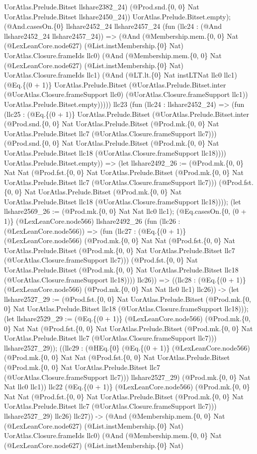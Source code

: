 \documentclass[11pt]{article}
\begin{document}
UorAtlas.Prelude.Bitset llshare2382\_24) (@Prod.snd.\{0, 0\} Nat UorAtlas.Prelude.Bitset llshare2450\_24)) UorAtlas.Prelude.Bitset.empty); (@And.casesOn.\{0\} llshare2452\_24 llshare2457\_24 (fun (llc24 : (@And llshare2452\_24 llshare2457\_24)) => (@And (@Membership.mem.\{0, 0\} Nat (@LexLeanCore.node627) (@List.instMembership.\{0\} Nat) UorAtlas.Closure.frameIds llc0) (@And (@Membership.mem.\{0, 0\} Nat (@LexLeanCore.node627) (@List.instMembership.\{0\} Nat) UorAtlas.Closure.frameIds llc1) (@And (@LT.lt.\{0\} Nat instLTNat llc0 llc1) (@Eq.\{(0 + 1)\} UorAtlas.Prelude.Bitset (@UorAtlas.Prelude.Bitset.inter (@UorAtlas.Closure.frameSupport llc0) (@UorAtlas.Closure.frameSupport llc1)) UorAtlas.Prelude.Bitset.empty))))) llc23 (fun (llc24 : llshare2452\_24) => (fun (llc25 : (@Eq.\{(0 + 1)\} UorAtlas.Prelude.Bitset (@UorAtlas.Prelude.Bitset.inter (@Prod.snd.\{0, 0\} Nat UorAtlas.Prelude.Bitset (@Prod.mk.\{0, 0\} Nat UorAtlas.Prelude.Bitset llc7 (@UorAtlas.Closure.frameSupport llc7))) (@Prod.snd.\{0, 0\} Nat UorAtlas.Prelude.Bitset (@Prod.mk.\{0, 0\} Nat UorAtlas.Prelude.Bitset llc18 (@UorAtlas.Closure.frameSupport llc18)))) UorAtlas.Prelude.Bitset.empty)) => (let llshare2492\_26 := (@Prod.mk.\{0, 0\} Nat Nat (@Prod.fst.\{0, 0\} Nat UorAtlas.Prelude.Bitset (@Prod.mk.\{0, 0\} Nat UorAtlas.Prelude.Bitset llc7 (@UorAtlas.Closure.frameSupport llc7))) (@Prod.fst.\{0, 0\} Nat UorAtlas.Prelude.Bitset (@Prod.mk.\{0, 0\} Nat UorAtlas.Prelude.Bitset llc18 (@UorAtlas.Closure.frameSupport llc18)))); (let llshare2569\_26 := (@Prod.mk.\{0, 0\} Nat Nat llc0 llc1); (@Eq.casesOn.\{0, (0 + 1)\} (@LexLeanCore.node566) llshare2492\_26 (fun (llc26 : (@LexLeanCore.node566)) => (fun (llc27 : (@Eq.\{(0 + 1)\} (@LexLeanCore.node566) (@Prod.mk.\{0, 0\} Nat Nat (@Prod.fst.\{0, 0\} Nat UorAtlas.Prelude.Bitset (@Prod.mk.\{0, 0\} Nat UorAtlas.Prelude.Bitset llc7 (@UorAtlas.Closure.frameSupport llc7))) (@Prod.fst.\{0, 0\} Nat UorAtlas.Prelude.Bitset (@Prod.mk.\{0, 0\} Nat UorAtlas.Prelude.Bitset llc18 (@UorAtlas.Closure.frameSupport llc18)))) llc26)) => ((llc28 : (@Eq.\{(0 + 1)\} (@LexLeanCore.node566) (@Prod.mk.\{0, 0\} Nat Nat llc0 llc1) llc26)) -> (let llshare2527\_29 := (@Prod.fst.\{0, 0\} Nat UorAtlas.Prelude.Bitset (@Prod.mk.\{0, 0\} Nat UorAtlas.Prelude.Bitset llc18 (@UorAtlas.Closure.frameSupport llc18))); (let llshare2529\_29 := (@Eq.\{(0 + 1)\} (@LexLeanCore.node566) (@Prod.mk.\{0, 0\} Nat Nat (@Prod.fst.\{0, 0\} Nat UorAtlas.Prelude.Bitset (@Prod.mk.\{0, 0\} Nat UorAtlas.Prelude.Bitset llc7 (@UorAtlas.Closure.frameSupport llc7))) llshare2527\_29)); ((llc29 : (@HEq.\{0\} (@Eq.\{(0 + 1)\} (@LexLeanCore.node566) (@Prod.mk.\{0, 0\} Nat Nat (@Prod.fst.\{0, 0\} Nat UorAtlas.Prelude.Bitset (@Prod.mk.\{0, 0\} Nat UorAtlas.Prelude.Bitset llc7 (@UorAtlas.Closure.frameSupport llc7))) llshare2527\_29) (@Prod.mk.\{0, 0\} Nat Nat llc0 llc1)) llc22 (@Eq.\{(0 + 1)\} (@LexLeanCore.node566) (@Prod.mk.\{0, 0\} Nat Nat (@Prod.fst.\{0, 0\} Nat UorAtlas.Prelude.Bitset (@Prod.mk.\{0, 0\} Nat UorAtlas.Prelude.Bitset llc7 (@UorAtlas.Closure.frameSupport llc7))) llshare2527\_29) llc26) llc27)) -> (@And (@Membership.mem.\{0, 0\} Nat (@LexLeanCore.node627) (@List.instMembership.\{0\} Nat) UorAtlas.Closure.frameIds llc0) (@And (@Membership.mem.\{0, 0\} Nat (@LexLeanCore.node627) (@List.instMembership.\{0\} Nat) 
\end{document}

